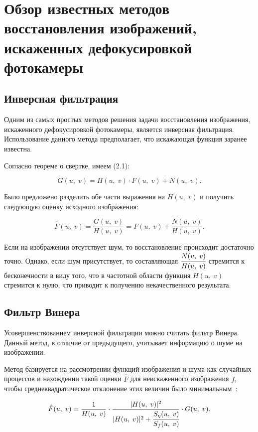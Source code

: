 \chapter{Обзор известных методов восстановления изображений, искаженных дефокусировкой фотокамеры}
\label{cha:design}

\section{Инверсная фильтрация}

Одним из самых простых методов решения задачи восстановления изображения, искаженного дефокусировкой фотокамеры, является инверсная фильтрация. Использование данного метода предполагает, что искажающая функция заранее известна.

Согласно теореме о свертке, имеем (2.1):

\begin{equation}
	G(u,\;v) = H(u,\;v) \cdot F(u,\;v) + N(u,\;v).
\end{equation}

Было предложено разделить обе части выражения на $H(u,\;v)$ и получить следующую оценку исходного изображения:

\begin{equation}
	\hat{F}(u,\;v) = \frac{G(u,\;v)}{H(u,\;v)} = F(u,\;v) + \frac{N(u,\;v)}{H(u,\;v)}.
\end{equation}

Если на изображении отсутствует шум, то восстановление происходит достаточно точно. Однако, если шум присутствует, то составляющая $\cfrac{N(u,\;v)}{H(u,\;v)}$ стремится к бесконечности в виду того, что в частотной области функция $H(u,\;v)$ стремится к нулю, что приводит к получению некачественного результата.

\section{Фильтр Винера}

Усовершенствованием инверсной фильтрации можно считать фильтр Винера.~\cite{noise_reasons} Данный метод, в отличие от предыдущего, учитывает информацию о шуме на изображении.

Метод базируется на рассмотрении функций изображения и шума как случайных процессов и нахождении такой оценки $\hat{F}$ для неискаженного изображения $f$, чтобы среднеквадратическое отклонение этих величин было минимальным~\cite{viner}:

\begin{equation}
    \hat{F}(u,\;v) = \frac{1}{H(u,\;v)}\cdot \frac{|H(u,\;v)|^2}{|H(u,\;v)|^2 + \cfrac{S_\eta(u,\;v)}{S_f(u,\;v)}} \cdot G(u,\;v).
\end{equation}

